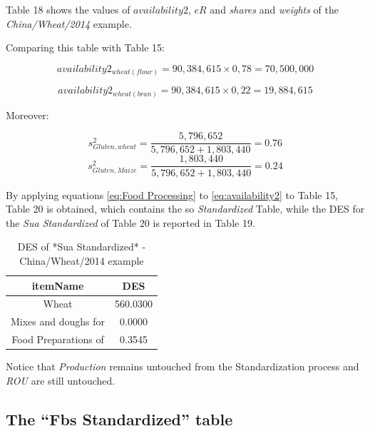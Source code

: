 \documentclass[]{article}
\begin{document}
Table 18 shows the values of \(availability2\), \(eR\) and \emph{shares}
and \emph{weights} of the \emph{China/Wheat/2014} example.

Comparing this table with Table 15:

\begin{equation}
\label{eq:avExample1}
availability2_{wheat(flour)} = 90,384,615\times 0,78 = 70,500,000
\end{equation}

\begin{equation}
\label{eq:avExample2}
availability2_{wheat(bran)} = 90,384,615\times 0,22 = 19,884,615
\end{equation}

Moreover:

\begin{equation}
\label{eq:shareEx1}
s^{2}_{Gluten,wheat} = \frac{5,796,652}{5,796,652 + 1,803,440} = 0.76
\end{equation}\begin{equation}
\label{eq:shareEx1}
s^{2}_{Gluten,Maize} = \frac{1,803,440}{5,796,652 + 1,803,440} = 0.24
\end{equation}

By applying equations \ref{eq:Food Processing} to \ref{eq:availability2}
to Table 15, Table 20 is obtained, which contains the so
\emph{Standardized} Table, while the DES for the \emph{Sua Standardized}
of Table 20 is reported in Table 19.

\begin{table}

\caption{\label{tab:t20}DES of *Sua Standardized* - China/Wheat/2014 example}
\centering
\begin{tabular}[t]{c|c}
\hline
itemName & DES\\
\hline
Wheat & 560.0300\\
\hline
Mixes and doughs for & 0.0000\\
\hline
Food Preparations of & 0.3545\\
\hline
\end{tabular}
\end{table}

Notice that \emph{Production} remains untouched from the Standardization
process and \emph{ROU} are still untouched.

\subsection*{\texorpdfstring{The ``Fbs Standardized''
table}{The Fbs Standardized table}}\label{the-fbs-standardized-table}
\end{document}
